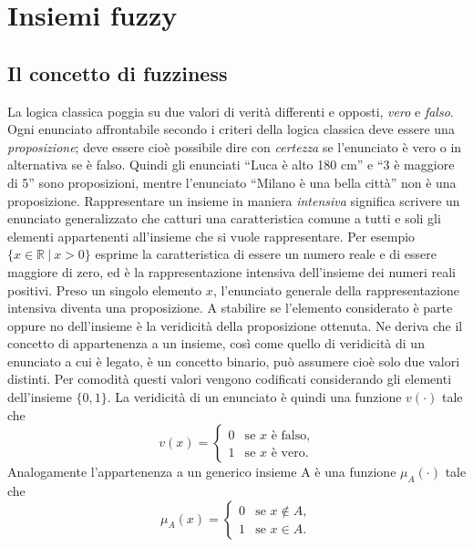 \documentclass [11pt,a4paper,twoside,openright] {book}
\begin{document}
\chapter{Insiemi fuzzy}
\section{Il concetto di fuzziness}
La logica classica poggia su due valori di verità differenti e opposti, \textit{vero} e \textit{falso}. Ogni enunciato affrontabile secondo i criteri della logica classica deve essere una \textit{proposizione}; deve essere cioè possibile dire con \textit{certezza} se l'enunciato è vero o in alternativa se è falso. Quindi gli enunciati ``Luca è alto 180 cm'' e ``3 è maggiore di 5'' sono proposizioni, mentre l'enunciato ``Milano è una bella città'' non è una proposizione. Rappresentare un insieme in maniera \textit{intensiva} significa scrivere un enunciato generalizzato che catturi una caratteristica comune a tutti e soli gli elementi appartenenti all'insieme che si vuole rappresentare. Per esempio $\lbrace x \in \mathbb{R} \: | \: x>0 \rbrace$ esprime la caratteristica di essere un numero reale e di essere maggiore di zero, ed è la rappresentazione intensiva dell'insieme dei numeri reali positivi. Preso un singolo elemento $x$, l'enunciato generale della rappresentazione intensiva diventa una proposizione. A stabilire se l'elemento considerato è parte oppure no dell'insieme è la veridicità della proposizione ottenuta. Ne deriva che il concetto di appartenenza a un insieme, così come quello di veridicità di un enunciato a cui è legato, è un concetto binario, può assumere cioè solo due valori distinti. Per comodità questi valori vengono codificati considerando gli elementi dell'insieme $\lbrace 0, 1 \rbrace$. La veridicità di un enunciato è quindi una funzione $v(\cdot)$ tale che
\begin{equation}
v(x)=
\begin{cases}
0 & \text{se } x \text{ è falso,} \\
1 & \text{se } x \text{ è vero.}
\end{cases}
\end{equation}
Analogamente l'appartenenza a un generico insieme A è una funzione $\mu_{A}(\cdot)$ tale che
\begin{equation}
\mu_{A}(x)=
\begin{cases}
0 & \text{se } x \notin A ,\\
1 & \text{se } x \in A.
\end{cases}
\end{equation}
\end{document}
